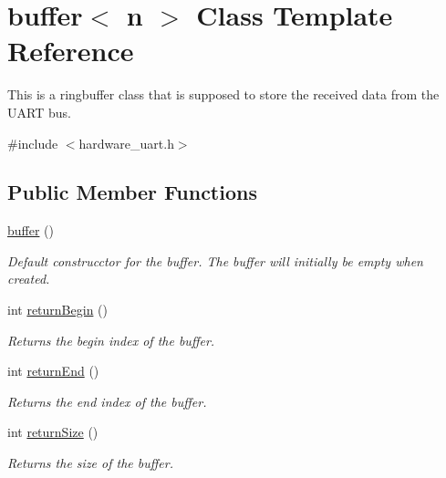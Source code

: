 \hypertarget{classbuffer}{}\section{buffer$<$ n $>$ Class Template Reference}
\label{classbuffer}


This is a ringbuffer class that is supposed to store the received data from the U\+A\+RT bus.  




{\ttfamily \#include $<$hardware\+\_\+uart.\+h$>$}

\subsection*{Public Member Functions}
\begin{DoxyCompactItemize}
\item 
\mbox{\label{classbuffer_af167e2486ec566cacd9fc3d48bd42e80}} 
\hyperlink{classbuffer_af167e2486ec566cacd9fc3d48bd42e80}{buffer} ()
\begin{DoxyCompactList}\small\item\em Default construcctor for the buffer. The buffer will initially be empty when created. \end{DoxyCompactList}\item 
\mbox{\label{classbuffer_aff92199fadb5da62646008c2fa7b3a07}} 
int \hyperlink{classbuffer_aff92199fadb5da62646008c2fa7b3a07}{return\+Begin} ()
\begin{DoxyCompactList}\small\item\em Returns the begin index of the buffer. \end{DoxyCompactList}\item 
\mbox{\label{classbuffer_ae6ef03f00a09332e04e21f61bd216767}} 
int \hyperlink{classbuffer_ae6ef03f00a09332e04e21f61bd216767}{return\+End} ()
\begin{DoxyCompactList}\small\item\em Returns the end index of the buffer. \end{DoxyCompactList}\item 
\mbox{\label{classbuffer_ade7959181a0fe6c4dff38053a07b2ece}} 
int \hyperlink{classbuffer_ade7959181a0fe6c4dff38053a07b2ece}{return\+Size} ()
\begin{DoxyCompactList}\small\item\em Returns the size of the buffer. \end{DoxyCompactList}\item 

\end{DoxyCompactItemize}
